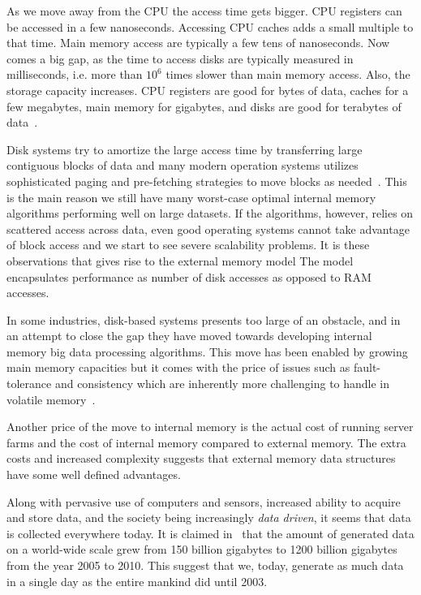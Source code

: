 \documentclass[twoside,11pt,openright]{report}
\begin{document}
As we move away from the CPU the access time gets bigger. CPU registers can be accessed in a few nanoseconds. Accessing CPU caches adds a small multiple to that time. Main memory access are typically a few tens of nanoseconds. Now comes a big gap, as the time to access disks are typically measured in milliseconds, i.e. more than $10^6$ times slower than main memory access. Also, the storage capacity increases. CPU registers are good for bytes of data, caches for a few megabytes, main memory for gigabytes, and disks are good for terabytes of data~\cite{Tanenbaum:1998:SCO:552473}.

Disk systems try to amortize the large access time by transferring large contiguous blocks of data and many modern operation systems utilizes sophisticated paging and pre-fetching strategies to move blocks as needed~\cite{Tanenbaum:2007:MOS:1410217}. This is the main reason we still have many worst-case optimal internal memory algorithms performing well on large datasets. If the algorithms, however, relies on scattered access across data, even good operating systems cannot take advantage of block access and we start to see severe scalability problems. It is these observations that gives rise to the external memory model The model encapsulates performance as number of disk accesses as opposed to RAM accesses.

In some industries, disk-based systems presents too large of an obstacle, and in an attempt to close the gap they have moved towards developing internal memory big data processing algorithms. This move has been enabled by growing main memory capacities but it comes with the price of issues such as fault-tolerance and consistency which are inherently more challenging to handle in volatile memory~\cite{Zhang2015}.

Another price of the move to internal memory is the actual cost of running server farms and the cost of internal memory compared to external memory. The extra costs and increased complexity suggests that external memory data structures have some well defined advantages.

Along with pervasive use of computers and sensors, increased ability to acquire and store data, and the society being increasingly \textit{data driven}, it seems that data is collected everywhere today. It is claimed in~\cite{economist:0210} that the amount of generated data on a world-wide scale grew from 150 billion gigabytes to 1200 billion gigabytes from the year 2005 to 2010. This suggest that we, today, generate as much data in a single day as the entire mankind did until 2003.
\end{document}
